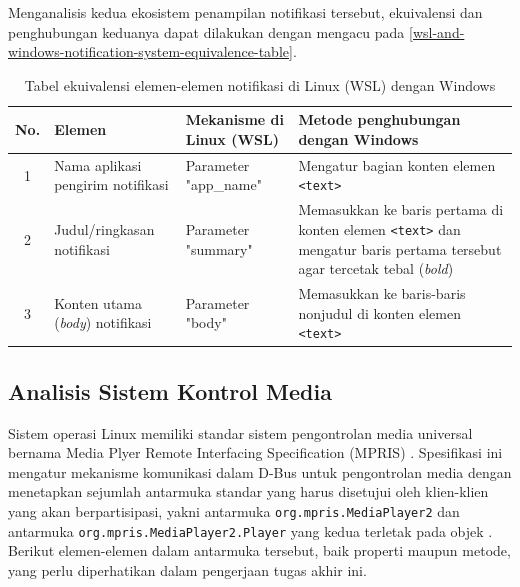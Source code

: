 Menganalisis kedua ekosistem penampilan notifikasi tersebut, ekuivalensi dan penghubungan keduanya dapat dilakukan dengan mengacu pada \autoref{wsl-and-windows-notification-system-equivalence-table}.

\begin{table}[h]
    \centering
    \caption{Tabel ekuivalensi elemen-elemen notifikasi di Linux (WSL) dengan Windows}
    \label{wsl-and-windows-notification-system-equivalence-table}
    \begin{tabularx}{\textwidth}{|c|p{3cm}|X|X|} \hline
        \textbf{No.} & \textbf{Elemen} & \textbf{Mekanisme di Linux (WSL)} & \textbf{Metode penghubungan dengan Windows}\\ \hline
        1 & Nama aplikasi pengirim notifikasi & Parameter "app\_name" & Mengatur bagian konten elemen \verb|<text>|\\ \hline
        2 & Judul/ringkasan notifikasi & Parameter "summary" & Memasukkan ke baris pertama di konten elemen \verb|<text>| dan mengatur baris pertama tersebut agar tercetak tebal (\textit{bold})\\ \hline
        3 & Konten utama (\textit{body}) notifikasi & Parameter "body" & Memasukkan ke baris-baris nonjudul di konten elemen \verb|<text>|\\ \hline
    \end{tabularx}
\end{table}

\subsection{Analisis Sistem Kontrol Media}

Sistem operasi Linux memiliki standar sistem pengontrolan media universal bernama Media Plyer Remote Interfacing Specification (MPRIS) \cite{xdg-mpris-specification}. Spesifikasi ini mengatur mekanisme komunikasi dalam D-Bus untuk pengontrolan media dengan menetapkan sejumlah antarmuka standar yang harus disetujui oleh klien-klien yang akan berpartisipasi, yakni antarmuka \verb|org.mpris.MediaPlayer2| dan antarmuka \verb|org.mpris.MediaPlayer2.Player| yang kedua terletak pada objek . Berikut elemen-elemen dalam antarmuka tersebut, baik properti maupun metode, yang perlu diperhatikan dalam pengerjaan tugas akhir ini.

